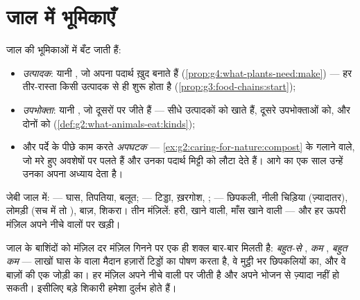 \section{जाल में भूमिकाएँ}

\begin{definition}[उत्पादक और उपभोक्ता]\label{def:g5:food-webs:roles}
जाल की  भूमिकाओं में बँट जाती हैं:
\begin{itemize}
  \item \emph{उत्पादक}: यानी , जो अपना पदार्थ ख़ुद
        बनाते हैं (\cref{prop:g4:what-plants-need:make}) --- हर
        तीर-रास्ता किसी उत्पादक से ही शुरू होता है
        (\cref{prop:g3:food-chains:start});
  \item \emph{उपभोक्ता}: यानी , जो दूसरों पर जीते
        हैं ---  सीधे उत्पादकों को खाते हैं,  दूसरे
        उपभोक्ताओं को, और  दोनों को
        (\cref{def:g2:what-animals-eat:kinds});
  \item और पर्दे के पीछे काम करते \emph{अपघटक} ---
        \cref{ex:g2:caring-for-nature:compost} के गलाने वाले, जो मरे
        हुए अवशेषों पर पलते हैं और उनका पदार्थ मिट्टी को लौटा देते
        हैं। आगे का एक साल उन्हें उनका अपना अध्याय देता है।
\end{itemize}
\end{definition}

\begin{example}[चित्र को छाँटना]\label{ex:g5:food-webs:sorting}
जेबी जाल में:  --- घास, तिपतिया, बलूत;   ---
टिड्डा, ख़रगोश, ;   --- छिपकली, नीली चिड़िया
(ज़्यादातर), लोमड़ी (सच में तो ), बाज़, शिकरा। तीन मंज़िलें:
हरी,  खाने वाली, माँस खाने वाली --- और हर ऊपरी मंज़िल अपने नीचे
वालों पर खड़ी।
\end{example}

\begin{proposition}[संख्याओं की शक्ल]\label{prop:g5:food-webs:pyramid}
जाल के बाशिंदों को मंज़िल दर मंज़िल गिनने पर एक ही शक्ल बार-बार मिलती
है: \emph{बहुत-से} , \emph{कम} , \emph{बहुत कम}
 --- लाखों घास के  वाला मैदान हज़ारों टिड्डों का पोषण
करता है, वे मुट्ठी भर छिपकलियों का, और वे बाज़ों की एक जोड़ी का। हर
मंज़िल अपने नीचे वाली पर जीती है और अपने भोजन से ज़्यादा नहीं हो सकती।
इसीलिए बड़े शिकारी हमेशा दुर्लभ होते हैं।
\end{proposition}
\admitted

